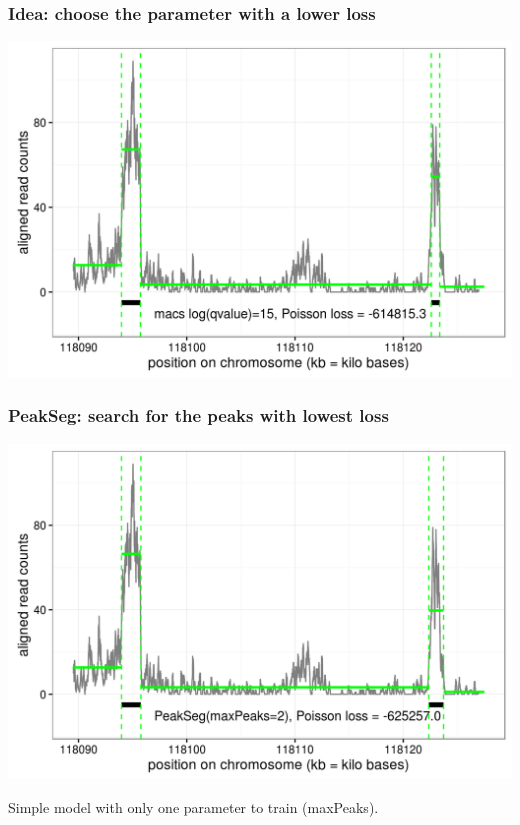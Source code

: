 \documentclass{beamer}
\begin{document}
\begin{frame}
  \frametitle{Idea: choose the parameter with a lower loss}
  \includegraphics[width=1\textwidth]{figure-macs-problem-15.png}
\end{frame}

\begin{frame}
  \frametitle{PeakSeg: search for the peaks with lowest loss}
  \includegraphics[width=1\textwidth]{figure-macs-problem-PeakSeg.png}
  
  Simple model with only one parameter to train (maxPeaks).
\end{frame}
\end{document}

